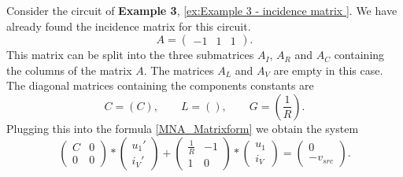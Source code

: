 \begin{example}
	\label{ex:Example 3 - MNA}
	Consider the circuit of \textbf{Example 3}, \ref{ex:Example 3 - incidence matrix }. We have already found the incidence matrix for this circuit.
	\begin{displaymath}
		A = 
		\left(
		\begin{matrix}
			-1 & 1 & 1
		\end{matrix}
		\right).
	\end{displaymath} 
	This matrix can be split into the three submatrices $A_I$, $A_R$ and $A_C$ containing the columns of the matrix $A$. The matrices $A_L$ and $A_V$ are empty in this case. The diagonal matrices containing the components constants are
	\begin{displaymath}
		C = (C), \qquad L = (), \qquad G = (\frac{1}{R}).
	\end{displaymath}
	Plugging this into the formula \eqref{MNA_Matrixform} we obtain the system
	\begin{displaymath}
		\begin{pmatrix}
			C & 0 \\
			0 & 0 
		\end{pmatrix}
		*
		\begin{pmatrix}
			u_1' \\
			i_V'
		\end{pmatrix}
		+
		\begin{pmatrix}
			\frac{1}{R} & -1 \\
			1 & 0
		\end{pmatrix}
		*
		\begin{pmatrix}
			u_1 \\
			i_V
		\end{pmatrix}
		=
		\begin{pmatrix}
			0 \\
			-v_{src}
		\end{pmatrix}.
	\end{displaymath}
\end{example}

